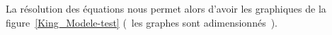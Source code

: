 	La résolution des équations nous permet alors d'avoir les graphiques de la
	figure~\ref{King_Modele-test} (~les graphes sont adimensionnés~).%



